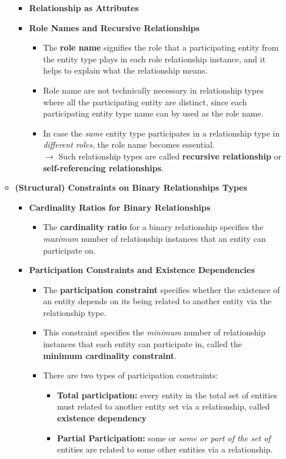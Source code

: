 \documentclass[10pt]{article}
\begin{document}
\begin{enumerate}
\begin{itemize}
\begin{itemize}
			\item \textbf{Relationship as Attributes}
			\item \textbf{Role Names and Recursive Relationships}
			\begin{itemize}
				\item The \textbf{role name} signifies the role that a participating entity from the entity type plays in each role relationship instance, and it helps to explain what the relationship means.
				\item Role name are not technically necessary in relationship types where all the participating entity are distinct, since each participating entity type name can by used as the role name.
				\item In case the \textit{same} entity type participates in a relationship type in \textit{different roles}, the role name becomes essential. \\
				$\rightarrow$ Such relationship types are called \textbf{recursive relationship} or \textbf{self-referencing relationships}. 
			\end{itemize}
		\end{itemize}

		\item \textbf{(Structural) Constraints on Binary Relationships Types}
		\begin{itemize}
			\item \textbf{Cardinality Ratios for Binary Relationships}
			\begin{itemize}
				\item The \textbf{cardinality ratio} for a binary relationship specifies the \textit{maximum} number of relationship instances that an entity can participate on.
			\end{itemize}

			\item \textbf{Participation Constraints and Existence Dependencies}
			\begin{itemize}
				\item The \textbf{participation constraint} specifies whether the existence of an entity depends on its being related to another entity via the relationship type.
				\item This constraint specifies the \textit{minimum} number of relationship instances that each entity can participate in, called the \textbf{minimum cardinality constraint}.
				\item There are two types of participation constraints:
				\begin{itemize}
					\item \textbf{Total participation: } every entity in the total set of entities must related to another entity set via a relationship, called \textbf{existence dependency}
					\item \textbf{Partial Participation: } some or \textit{some or part of the set of} entities are related to some other entities via a relationship. 
				\end{itemize}
			\end{itemize}
		\end{itemize}


\end{itemize}
\end{enumerate}
\end{document}
